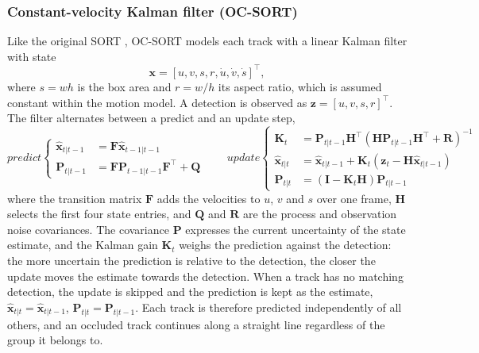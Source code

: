 \documentclass[9pt,twoside]{pnas-new}
\begin{document}
\subsubsection*{Constant-velocity Kalman filter (OC-SORT)}
Like the original SORT \cite{sort}, OC-SORT \cite{ocsort} models each track with a linear Kalman filter \cite{kalman} with state
\begin{equation}
  \mathbf{x} = [u, v, s, r, \dot u, \dot v, \dot s]^\top,
  \label{eq:state}
\end{equation}
where $s = wh$ is the box area and $r = w/h$ its aspect ratio, which is assumed constant within the motion model.
A detection is observed as $\mathbf{z} = [u, v, s, r]^\top$. The filter alternates between a predict and an update step,
\begin{equation}
  \textit{predict}\left\{
  \begin{aligned}
    \hat{\mathbf{x}}_{t|t-1} &= \mathbf{F}\hat{\mathbf{x}}_{t-1|t-1} \\
    \mathbf{P}_{t|t-1} &= \mathbf{F}\mathbf{P}_{t-1|t-1}\mathbf{F}^\top + \mathbf{Q}
  \end{aligned}\right.
  \qquad
  \textit{update}\left\{
  \begin{aligned}
    \mathbf{K}_t &= \mathbf{P}_{t|t-1}\mathbf{H}^\top(\mathbf{H}\mathbf{P}_{t|t-1}\mathbf{H}^\top + \mathbf{R})^{-1} \\
    \hat{\mathbf{x}}_{t|t} &= \hat{\mathbf{x}}_{t|t-1} + \mathbf{K}_t(\mathbf{z}_t - \mathbf{H}\hat{\mathbf{x}}_{t|t-1}) \\
    \mathbf{P}_{t|t} &= (\mathbf{I} - \mathbf{K}_t\mathbf{H})\mathbf{P}_{t|t-1}
  \end{aligned}\right.
  \label{eq:kf}
\end{equation}
where the transition matrix $\mathbf{F}$ adds the velocities to $u$, $v$ and $s$ over one frame, $\mathbf{H}$ selects the first four state entries, and $\mathbf{Q}$ and $\mathbf{R}$ are the process and observation noise covariances.
The covariance $\mathbf{P}$ expresses the current uncertainty of the state estimate, and the Kalman gain $\mathbf{K}_t$ weighs the prediction against the detection: the more uncertain the prediction is relative to the detection, the closer the update moves the estimate towards the detection.
When a track has no matching detection, the update is skipped and the prediction is kept as the estimate, $\hat{\mathbf{x}}_{t|t} = \hat{\mathbf{x}}_{t|t-1}$, $\mathbf{P}_{t|t} = \mathbf{P}_{t|t-1}$.
Each track is therefore predicted independently of all others, and an occluded track continues along a straight line regardless of the group it belongs to.
\end{document}
